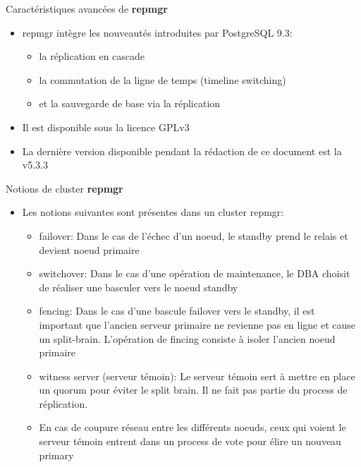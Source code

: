 
\begin{frame}[fragile]{Caractéristiques avancées de \textbf{repmgr}}

   \begin{itemize}
      \item repmgr intègre les nouveautés introduites par PostgreSQL 9.3:
         \begin{itemize}
            \item la réplication en cascade
            \item la commutation de la ligne de temps (timeline switching)
            \item et la sauvegarde de base via la réplication
         \end{itemize}
      \item Il est disponible sous la licence GPLv3
      \item La dernière version disponible pendant la rédaction de ce document est la v5.3.3
   \end{itemize}

\end{frame}


\begin{frame}[fragile]{Notions de cluster \textbf{repmgr}}

   \begin{itemize}
      \item Les notions suivantes sont présentes dans un cluster repmgr:
      \begin{itemize}
         \item failover: Dans le cas de l'échec d'un noeud, le standby prend le relais et devient noeud primaire
         \item switchover: Dans le cas d'une opération de maintenance, le DBA choisit de réaliser une basculer vers le noeud standby
         \item fencing: Dans le cas d'une bascule failover vers le standby, il est important que l'ancien serveur primaire ne revienne pas en ligne et cause un split-brain. L'opération de fincing consiste à isoler l'ancien noeud primaire
         \item witness server (serveur témoin): Le serveur témoin sert à mettre en place un quorum pour éviter le split brain. Il ne fait pas partie du process de réplication.
         \item En cas de coupure réseau entre les différents noeuds, ceux qui voient le serveur témoin entrent dans un process de vote pour élire un nouveau primary
      \end{itemize}
   \end{itemize}

\end{frame}

